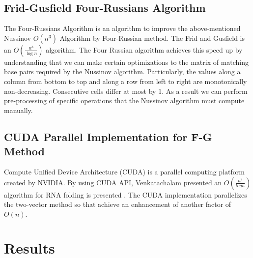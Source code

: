 \documentclass[12pt]{article}
\begin{document}
\subsection{Frid-Gusfield Four-Russians Algorithm}
\par The Four-Russians Algorithm \cite{gusfield} is an algorithm to improve the
above-mentioned Nussinov $O(n^3)$ Algorithm by Four-Russian method. The Frid and Gusfield
is an $O(\frac{n^3}{\log n})$ algorithm. The Four Russian algorithm achieves this
speed up by understanding that we can make certain optimizations to the matrix of
matching base pairs required by the Nussinov algorithm. Particularly, the values
along a column from bottom to top and along a row from left to right are monotonically
non-decreasing. Consecutive cells differ at most by 1\cite{gusfield}. As a result we can
perform pre-processing of specific operations that the Nussinov algorithm must compute manually.

\subsection{CUDA Parallel Implementation for F-G Method}
\par Compute Unified Device Architecture (CUDA) is a parallel computing platform created by NVIDIA. By using CUDA API, Venkatachalam presented an $O(\frac{n^2}{logn})$ algorithm for RNA folding is presented \cite{balaji}. The CUDA implementation parallelizes the two-vector method so that achieve an enhancement of another factor of $O(n)$.

\section{Results}
\end{document}
